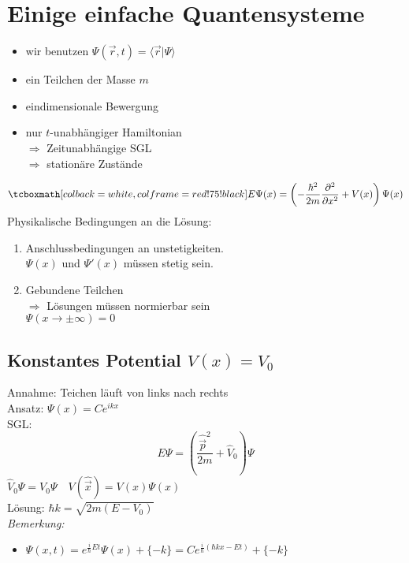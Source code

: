 \section{Einige einfache Quantensysteme}

\begin{itemize}
	\item wir benutzen $ \Psi(\vec{r},t) = \langle \vec{r}|\Psi \rangle $
	\item ein Teilchen der Masse $ m $
	\item eindimensionale Bewergung
	\item nur $ t $-unabhängiger Hamiltonian\\
	$ \Rightarrow $ Zeitunabhängige SGL\\
	$ \Rightarrow $ stationäre Zustände
\end{itemize}
\begin{equation*}
\rmbox{ E \Psi(x) = \left(-\frac{\hbar^2}{2m} \prt{^2}{x^2} + V(x)\right) \Psi(x) }
\end{equation*}
Physikalische Bedingungen an die Lösung:
\begin{enumerate}[(1)]
	\item Anschlussbedingungen an unstetigkeiten.\\
	$ \Psi(x) $ und $ \Psi'(x) $ müssen stetig sein.
	\item Gebundene Teilchen\\
	$ \Rightarrow $ Lösungen müssen normierbar sein\\
	$ \Psi(x \to \pm \infty) = 0 $
\end{enumerate}

\subsection{Konstantes Potential \texorpdfstring{$ V(x) = V_0 $}{V(x) = V0}}

Annahme: Teichen läuft von links nach rechts\\
Ansatz: $ \Psi(x) = C e^{i k x} $\\
SGL:
\begin{equation*}
E \Psi = \left(\frac{\hat{\vec{p}}^2}{2m} + \hat{V}_0\right) \Psi
\end{equation*}
$ \hat{V}_0 \Psi = V_0 \Psi \quad V(\hat{\vec{x}}) = V(x) \Psi(x) $\\
Lösung: $ \hbar k = \sqrt{2 m (E - V_0)} $\\
\emph{Bemerkung:}
\begin{itemize}
	\item $ \Psi(x,t) = e^{\frac{i}{\hbar} Et} \Psi(x) + \{ - k \} = C e^{\frac{i}{\hbar} (\hbar k x - Et)} + \{ - k \} $
\end{itemize}

